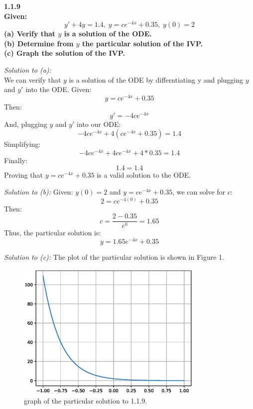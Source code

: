 \documentclass[12pt, letterpaper]{article}
\begin{document}
\setlength\parindent{0pt}
\textbf{
1.1.9\\
Given:
\[ y' + 4y = 1.4,\; y = ce^{-4x} + 0.35,\; y(0) = 2 \]
(a) Verify that $y$ is a solution of the ODE.\\
(b) Determine from $y$ the particular solution of the IVP.\\
(c) Graph the solution of the IVP.
}

\vspace{5mm}
\textit{Solution to (a):}\\
We can verify that $y$ is a solution of the ODE by differntiating y 
and plugging $y$ and $y'$ into the ODE. Given:
\[ y = ce^{-4x} + 0.35 \]
Then:
\[ y' = -4ce^{-4x} \]
And, plugging $y$ and $y'$ into our ODE:
\[ -4ce^{-4x} + 4(ce^{-4x} + 0.35) = 1.4 \]
Simplifying:
\[ -4ce^{-4x} + 4ce^{-4x} + 4*0.35 = 1.4 \]
Finally:
\[ 1.4 = 1.4 \]
Proving that $y = ce^{-4x} + 0.35$ is a valid solution to the ODE.

\vspace{5mm}
\textit{Solution to (b):}
Given: $y(0) = 2$ and $y = ce^{-4x} + 0.35$, we can solve for $c$:
\[ 2 = ce^{-4(0)} + 0.35 \]
Then:
\[ c = \frac{2-0.35}{e^0} = 1.65 \]
Thus, the particular solution is:
\[ y = 1.65e^{-4x} + 0.35\]

\newpage
\textit{Solution to (c):}
The plot of the particular solution is shown in Figure 1.

\begin{figure}
\centering
  \includegraphics[width=0.8\textwidth]{1.1.9_graph.eps}
\caption{graph of the particular solution to 1.1.9.}
\label{fig:1.1.9}
\end{figure}
\end{document}
